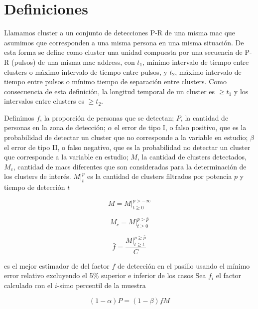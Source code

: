 \section{Definiciones}

Llamamos cluster a un conjunto de detecciones P-R de 
una misma mac que asumimos que corresponden a una misma persona en una misma situación. 
De esta forma se define como cluster una unidad compuesta por una 
secuencia de P-R (pulsos) de una misma mac address, con 
$t_1$, 
mí­nimo intervalo de tiempo entre clusters o 
máximo intervalo de tiempo entre pulsos, y 
$t_2$, 
máximo intervalo de tiempo entre pulsos o 
mí­nimo tiempo de separación entre clusters. 
Como consecuencia de esta definición, la longitud temporal de un cluster 
es $\ge t_1$ y los intervalos entre clusters es $\ge t_2$.

Definimos
$f$, la proporción de personas que se detectan;
$P$, la cantidad de personas en la zona de detección;
$\alpha$ el error de tipo I, o falso positivo, que es la probabilidad
de detectar un cluster que no corresponde a la variable en estudio;
$\beta$ el error de tipo II, o falso negativo, que es la probabilidad
no detectar un cluster que corresponde a la variable en estudio;
$M$, la cantidad de clusters detectados,
$M_c$, cantidad de macs diferentes que son consideradas para la determinación de los clusters de interés.
$M\big|^p_t$ es la cantidad de clusters filtrados por potencia $p$ y tiempo de detección $t$

\[
M = M\big|^{p>-\infty}_{t\ge 0}
\]

\[
M_c = M\big|^{p>\bar{p}}_{t\ge 0}
\]

\begin{equation}
\bar{f} =
\frac
{
M\big|
^{p \ge \bar{p}}
_{t \ge \bar{t}}
}
{C}
\end{equation}

es el mejor estimador de del factor $f$ de detección en el pasillo
usando el mínimo error relativo excluyendo el 5\% superior e inferior de los casos
Sea $f_i$ el factor calculado con el $i$-simo percentil de la muestra

\[
(1 - \alpha) P = (1 - \beta) f M
\]

